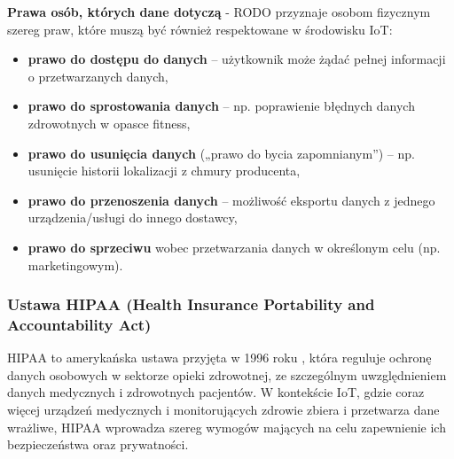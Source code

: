 \textbf{Prawa osób, których dane dotyczą} - RODO przyznaje osobom fizycznym szereg praw, które muszą być również respektowane w środowisku IoT:
\begin{itemize}
    \item \textbf{prawo do dostępu do danych} – użytkownik może żądać pełnej informacji o przetwarzanych danych,

    \item \textbf{prawo do sprostowania danych} – np. poprawienie błędnych danych zdrowotnych w opasce fitness,

    \item \textbf{prawo do usunięcia danych} („prawo do bycia zapomnianym”) – np. usunięcie historii lokalizacji z chmury producenta,

    \item \textbf{prawo do przenoszenia danych} – możliwość eksportu danych z jednego urządzenia/usługi do innego dostawcy,

    \item \textbf{prawo do sprzeciwu} wobec przetwarzania danych w określonym celu (np. marketingowym).
\end{itemize}


\subsubsection{Ustawa HIPAA (Health Insurance Portability and Accountability Act)}
HIPAA to amerykańska ustawa przyjęta w 1996 roku \cite{hipaa_security_rule}, która reguluje ochronę danych osobowych w sektorze opieki zdrowotnej, ze szczególnym uwzględnieniem danych medycznych i zdrowotnych pacjentów. W kontekście IoT, gdzie coraz więcej urządzeń medycznych i monitorujących zdrowie zbiera i przetwarza dane wrażliwe, HIPAA wprowadza szereg wymogów mających na celu zapewnienie ich bezpieczeństwa oraz prywatności.

